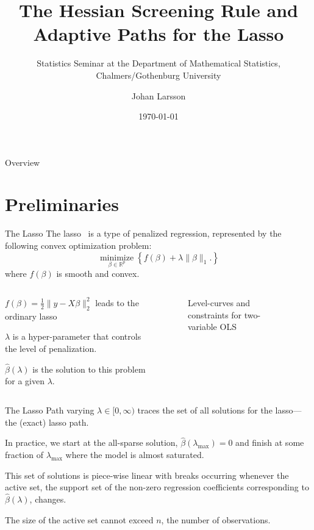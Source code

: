 \documentclass[10pt,ignorenonframetext]{beamer}
\title{The Hessian Screening Rule and Adaptive Paths for the Lasso}
\subtitle{Statistics Seminar at the Department of Mathematical Statistics,
  Chalmers/Gothenburg University}
\author{Johan Larsson}
\institute{Department of Statistics, Lund University}
\date{\today}
\begin{document}

\begin{frame}{Overview}
  \tableofcontents[hideallsubsections]
\end{frame}

\section{Preliminaries}

\begin{frame}{The Lasso}
  The lasso~\parencite{tibshirani1996} is a type of penalized regression,
  represented by the following
  convex optimization problem:
  \[
    \operatorname*{minimize}_{\beta \in \mathbb{R}^p}
    \left\{
      f(\beta) + \lambda \lVert \beta \rVert_1.
    \right\}
  \]
  where \(f(\beta)\) is smooth and convex.

  \begin{columns}[c]
    \begin{column}{0.45\linewidth}
      \(f(\beta) = \frac 1 2 \lVert y - X\beta\rVert_2^2\)
      leads to the ordinary lasso \medskip

      \(\lambda\) is a hyper-parameter that controls the level of
      \alert{penalization}.
      \medskip

      \(\hat\beta(\lambda)\) is the solution to this problem for a given
      \(\lambda.\)

    \end{column}
    \begin{column}{0.45\linewidth}
      \begin{figure}
        \centering
        \pgfplotsset{width=6cm,height=6cm}
        
        \caption{Level-curves and constraints for two-variable OLS}
      \end{figure}
    \end{column}
  \end{columns}
\end{frame}

\begin{frame}{The Lasso Path}
  varying \(\lambda \in [0, \infty)\) traces the set of all solutions for the
  lasso---the (exact) lasso path. \medskip

  In practice, we start at the all-sparse solution,
  \(\hat\beta(\lambda_\text{max}) = 0\) and finish at some fraction of
  \(\lambda_\text{max}\) where the model is almost saturated. \medskip

  \pause

  This set of solutions is piece-wise linear with breaks occurring whenever the
  active set, the support set of the non-zero regression coefficients
  corresponding to \(\hat\beta(\lambda)\), changes. \medskip

  The size of the active set cannot exceed \(n\), the number of observations.
\end{frame}
\end{document}
